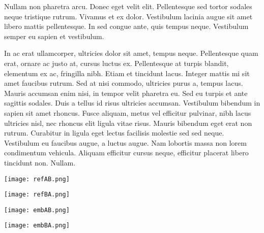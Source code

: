 Nullam non pharetra arcu. Donec eget velit elit. Pellentesque sed tortor sodales neque tristique rutrum. Vivamus et ex dolor. Vestibulum lacinia augue sit amet libero mattis pellentesque. In sed congue ante, quis tempus neque. Vestibulum semper eu sapien et vestibulum.

In ac erat ullamcorper, ultricies dolor sit amet, tempus neque. Pellentesque quam erat, ornare ac justo at, cursus luctus ex. Pellentesque at turpis blandit, elementum ex ac, fringilla nibh. Etiam et tincidunt lacus. Integer mattis mi sit amet faucibus rutrum. Sed at nisi commodo, ultricies purus a, tempus lacus. Mauris accumsan enim nisi, in tempor velit pharetra eu. Sed eu turpis et ante sagittis sodales. Duis a tellus id risus ultricies accumsan. Vestibulum bibendum in sapien sit amet rhoncus. Fusce aliquam, metus vel efficitur pulvinar, nibh lacus ultricies nisl, nec rhoncus elit ligula vitae risus. Mauris bibendum eget erat non rutrum. Curabitur in ligula eget lectus facilisis molestie sed sed neque. Vestibulum eu faucibus augue, a luctus augue. Nam lobortis massa non lorem condimentum vehicula. Aliquam efficitur cursus neque, efficitur placerat libero tincidunt non. Nullam.

\begin{center}
    \texttt{[image: refAB.png]}
\end{center}

\begin{center}
    \texttt{[image: refBA.png]}
\end{center}

\begin{center}
    \texttt{[image: embAB.png]}
\end{center}


\begin{center}
    \texttt{[image: embBA.png]}
\end{center}
